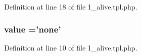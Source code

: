 Definition at line 18 of file 1\+\_\+alive.\+tpl.\+php.

\hypertarget{1__alive_8tpl_8php_afcc7a4b78ecd8fa7e713f8cfa0f51017}{
\subsubsection[{value}]{\setlength{\rightskip}{0pt plus 5cm}value ='none'}}\label{1__alive_8tpl_8php_afcc7a4b78ecd8fa7e713f8cfa0f51017}


Definition at line 10 of file 1\+\_\+alive.\+tpl.\+php.

